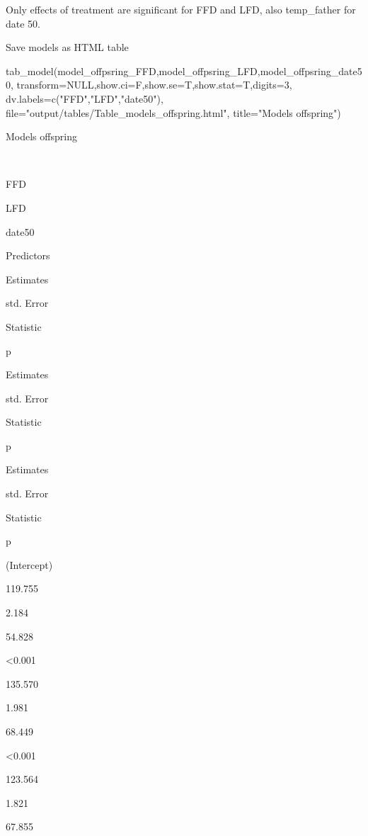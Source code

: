 \documentclass[
]{article}
\newenvironment{Shaded}{\begin{snugshade}}{\end{snugshade}}
\newcommand{\AttributeTok}[1]{\textcolor[rgb]{0.77,0.63,0.00}{#1}}
\newcommand{\ConstantTok}[1]{\textcolor[rgb]{0.00,0.00,0.00}{#1}}
\newcommand{\DecValTok}[1]{\textcolor[rgb]{0.00,0.00,0.81}{#1}}
\newcommand{\FunctionTok}[1]{\textcolor[rgb]{0.00,0.00,0.00}{#1}}
\newcommand{\NormalTok}[1]{#1}
\newcommand{\StringTok}[1]{\textcolor[rgb]{0.31,0.60,0.02}{#1}}
\begin{document}
Only effects of treatment are significant for FFD and LFD, also
temp\_father for date 50.

Save models as HTML table

\begin{Shaded}
\begin{Highlighting}[]
\FunctionTok{tab\_model}\NormalTok{(model\_offpsring\_FFD,model\_offpsring\_LFD,model\_offpsring\_date50,}
          \AttributeTok{transform=}\ConstantTok{NULL}\NormalTok{,}\AttributeTok{show.ci=}\NormalTok{F,}\AttributeTok{show.se=}\NormalTok{T,}\AttributeTok{show.stat=}\NormalTok{T,}\AttributeTok{digits=}\DecValTok{3}\NormalTok{,}
          \AttributeTok{dv.labels=}\FunctionTok{c}\NormalTok{(}\StringTok{"FFD"}\NormalTok{,}\StringTok{"LFD"}\NormalTok{,}\StringTok{"date50"}\NormalTok{),}
          \AttributeTok{file=}\StringTok{"output/tables/Table\_models\_offspring.html"}\NormalTok{,}
          \AttributeTok{title=}\StringTok{"Models offspring"}\NormalTok{)}
\end{Highlighting}
\end{Shaded}

Models offspring

~

FFD

LFD

date50

Predictors

Estimates

std. Error

Statistic

p

Estimates

std. Error

Statistic

p

Estimates

std. Error

Statistic

p

(Intercept)

119.755

2.184

54.828

\textless0.001

135.570

1.981

68.449

\textless0.001

123.564

1.821

67.855
\end{document}
